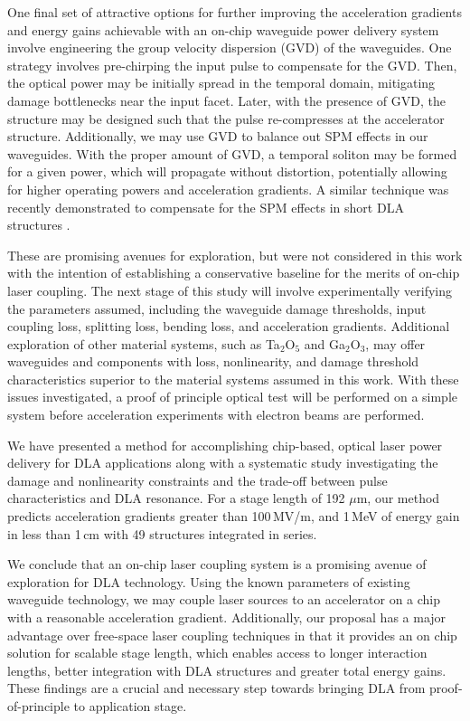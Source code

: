 One final set of attractive options for further improving the acceleration gradients and energy gains achievable with an on-chip waveguide power delivery system involve engineering the group velocity dispersion (GVD) of the waveguides.  One strategy involves pre-chirping the input pulse to compensate for the GVD.  Then, the optical power may be initially spread in the temporal domain, mitigating damage bottlenecks near the input facet.  Later, with the presence of GVD, the structure may be designed such that the pulse re-compresses at the accelerator structure.  Additionally, we may use GVD to balance out SPM effects in our waveguides.  With the proper amount of GVD, a temporal soliton may be formed for a given power, which will propagate without distortion, potentially allowing for higher operating powers and acceleration gradients. A similar technique was recently demonstrated to compensate for the SPM effects in short DLA structures \cite{cesar2017nonlinear}. 

These are promising avenues for exploration, but were not considered in this work with the intention of establishing a conservative baseline for the merits of on-chip laser coupling.  The next stage of this study will involve experimentally verifying the parameters assumed, including the waveguide damage thresholds, input coupling loss, splitting loss, bending loss, and acceleration gradients.  Additional exploration of other material systems, such as Ta$_2$O$_5$ \cite{belt2017ultra} and Ga$_2$O$_3$, may offer waveguides and components with loss, nonlinearity, and damage threshold characteristics superior to the material systems assumed in this work. With these issues investigated, a proof of principle optical test will be performed on a simple system before acceleration experiments with electron beams are performed.

We have presented a method for accomplishing chip-based, optical laser power delivery for DLA applications along with a systematic study investigating the damage and nonlinearity constraints and the trade-off between pulse characteristics and DLA resonance.  For a stage length of 192 $\mu$m, our method predicts acceleration gradients greater than 100\,MV/m, and 1\,MeV of energy gain in less than 1\,cm with 49 structures integrated in series.

We conclude that an on-chip laser coupling system is a promising avenue of exploration for DLA technology.  Using the known parameters of existing waveguide technology, we may couple laser sources to an accelerator on a chip with a reasonable acceleration gradient.  Additionally, our proposal has a major advantage over free-space laser coupling techniques in that it provides an on chip solution for scalable stage length, which enables access to longer interaction lengths, better integration with DLA structures and greater total energy gains.  These findings are a crucial and necessary step towards bringing DLA from proof-of-principle to application stage.


